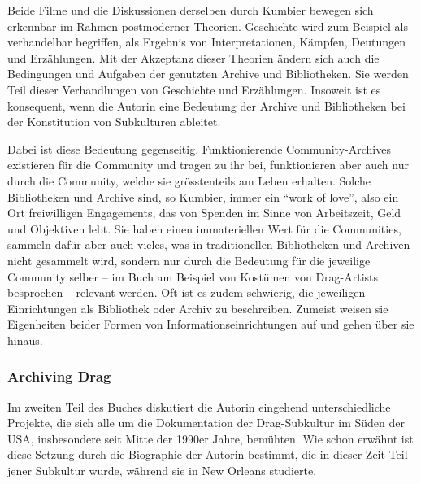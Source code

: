 \documentclass[a4paper,
fontsize=11pt,
oneside,
numbers=noperiodatend,
parskip=half-,
bibliography=totoc,
final
]{scrartcl}
\begin{document}
Beide Filme und die Diskussionen derselben durch Kumbier bewegen sich
erkennbar im Rahmen postmoderner Theorien. Geschichte wird zum Beispiel
als verhandelbar begriffen, als Ergebnis von Interpretationen, Kämpfen,
Deutungen und Erzählungen. Mit der Akzeptanz dieser Theorien ändern sich
auch die Bedingungen und Aufgaben der genutzten Archive und
Bibliotheken. Sie werden Teil dieser Verhandlungen von Geschichte und
Erzählungen. Insoweit ist es konsequent, wenn die Autorin eine Bedeutung
der Archive und Bibliotheken bei der Konstitution von Subkulturen
ableitet.

Dabei ist diese Bedeutung gegenseitig. Funktionierende
Community-Archives existieren für die Community und tragen zu ihr bei,
funktionieren aber auch nur durch die Community, welche sie
grösstenteils am Leben erhalten. Solche Bibliotheken und Archive sind,
so Kumbier, immer ein \enquote{work of love}, also ein Ort freiwilligen
Engagements, das von Spenden im Sinne von Arbeitszeit, Geld und
Objektiven lebt. Sie haben einen immateriellen Wert für die Communities,
sammeln dafür aber auch vieles, was in traditionellen Bibliotheken und
Archiven nicht gesammelt wird, sondern nur durch die Bedeutung für die
jeweilige Community selber -- im Buch am Beispiel von Kostümen von
Drag-Artists besprochen -- relevant werden. Oft ist es zudem schwierig,
die jeweiligen Einrichtungen als Bibliothek oder Archiv zu beschreiben.
Zumeist weisen sie Eigenheiten beider Formen von
Informationseinrichtungen auf und gehen über sie hinaus.

\subsubsection{Archiving Drag}\label{archiving-drag}

Im zweiten Teil des Buches diskutiert die Autorin eingehend
unterschiedliche Projekte, die sich alle um die Dokumentation der
Drag-Subkultur im Süden der USA, insbesondere seit Mitte der 1990er
Jahre, bemühten. Wie schon erwähnt ist diese Setzung durch die
Biographie der Autorin bestimmt, die in dieser Zeit Teil jener Subkultur
wurde, während sie in New Orleans studierte.
\end{document}
